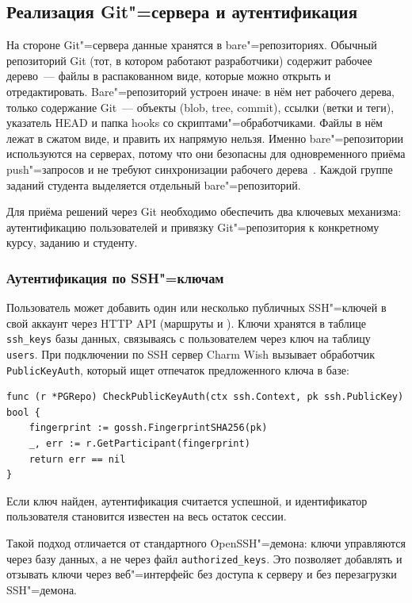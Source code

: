 \documentclass[coursework]{SCWorks}
\begin{document}
\subsection{Реализация Git"=сервера и аутентификация}

На стороне Git"=сервера данные хранятся в bare"=репозиториях. Обычный репозиторий Git (тот, в котором работают разработчики) содержит рабочее дерево~--- файлы в распакованном виде, которые можно открыть и отредактировать. Bare"=репозиторий устроен иначе: в нём нет рабочего дерева, только содержание Git~--- объекты (blob, tree, commit), ссылки (ветки и теги), указатель HEAD и папка hooks со скриптами"=обработчиками. Файлы в нём лежат в сжатом виде, и править их напрямую нельзя. Именно bare"=репозитории используются на серверах, потому что они безопасны для одновременного приёма push"=запросов и не требуют синхронизации рабочего дерева~\cite{chacon2014pro}. Каждой группе заданий студента выделяется отдельный bare"=репозиторий.

Для приёма решений через Git необходимо обеспечить два ключевых механизма: аутентификацию пользователей и привязку Git"=репозитория к конкретному курсу, заданию и студенту.

\subsubsection{Аутентификация по SSH"=ключам}

Пользователь может добавить один или несколько публичных SSH"=ключей в свой аккаунт через HTTP API (маршруты  и ). Ключи хранятся в таблице \texttt{ssh\_keys} базы данных, связываясь с пользователем через ключ на таблицу \texttt{users}. При подключении по SSH сервер Charm Wish вызывает обработчик \texttt{PublicKeyAuth}, который ищет отпечаток предложенного ключа в базе:

\begin{verbatim}
func (r *PGRepo) CheckPublicKeyAuth(ctx ssh.Context, pk ssh.PublicKey) bool {
    fingerprint := gossh.FingerprintSHA256(pk)
    _, err := r.GetParticipant(fingerprint)
    return err == nil
}
\end{verbatim}

Если ключ найден, аутентификация считается успешной, и идентификатор пользователя становится известен на весь остаток сессии.

Такой подход отличается от стандартного OpenSSH"=демона: ключи управляются через базу данных, а не через файл \texttt{authorized\_keys}. Это позволяет добавлять и отзывать ключи через веб"=интерфейс без доступа к серверу и без перезагрузки SSH"=демона.
\end{document}
